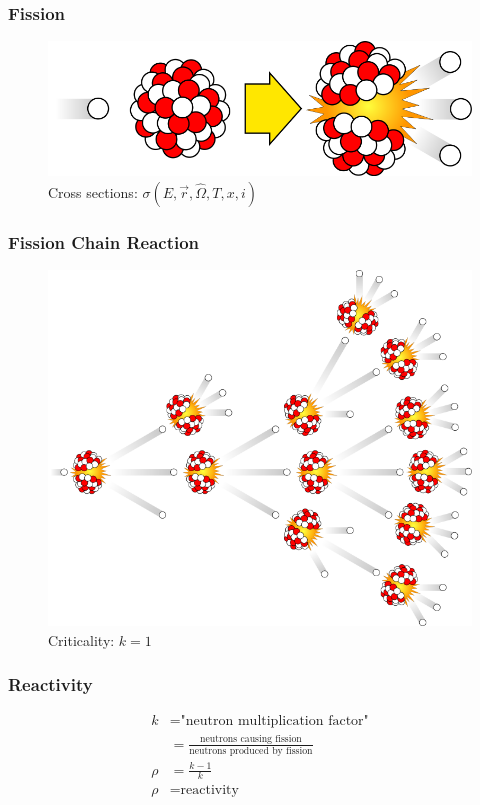 	
\begin{frame}
\frametitle{Fission}
  \begin{figure}[t]
   \includegraphics[width=\textwidth]{./images/fission.png}
	\caption{Cross sections: $\sigma(E,\vec{r},\hat{\Omega},T,x,i)$}
	\end{figure}
\end{frame}


\begin{frame}
\frametitle{Fission Chain Reaction}
  \begin{figure}[t]
   \includegraphics[height=0.75\textheight]{./images/fission-chain.png}
	\caption{Criticality: $k=1$}
	\end{figure}
\end{frame}

\begin{frame}
\frametitle{Reactivity}
		     \begin{align*}
		     k &= \mbox{"neutron multiplication factor"}\\
		     &= \frac{\mbox{neutrons causing fission}}{\mbox{neutrons produced by fission}}\\
		     \rho &= \frac{k-1}{k}\\
		     \rho &= \mbox{reactivity}\\
		     \end{align*}
\end{frame}

